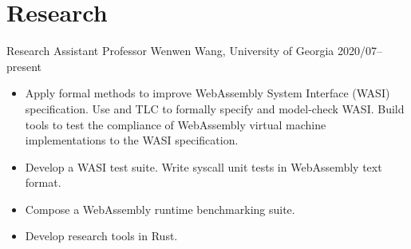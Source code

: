 \section{Research}

\begin{experiencelist}
    \experienceitem
        {Research Assistant}
        {Professor Wenwen Wang, University of Georgia}
        {2020/07--present}
    \begin{itemize}[noitemsep, topsep=0pt]
        \item
            Apply formal methods to improve WebAssembly System Interface (WASI)
            specification. Use \tlaplus and TLC to formally specify and
            model-check WASI. Build tools to test the compliance of WebAssembly
            virtual machine implementations to the WASI specification.
        \item
            Develop a WASI test suite. Write syscall unit tests in WebAssembly
            text format.
        \item Compose a WebAssembly runtime benchmarking suite.
        \item Develop research tools in Rust.
    \end{itemize}
\end{experiencelist}
